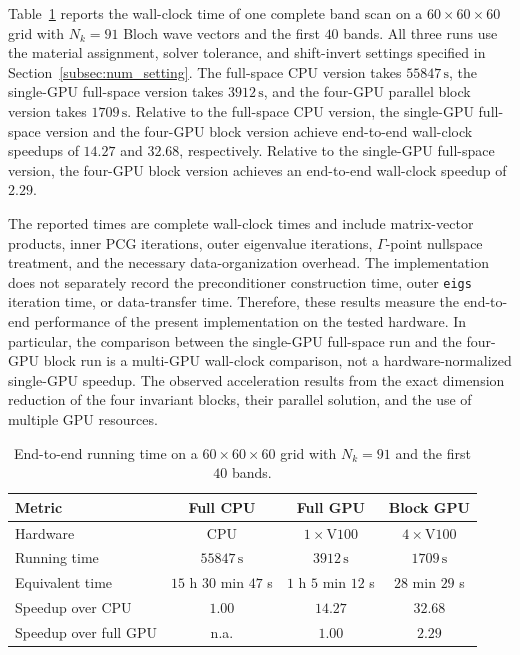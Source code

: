\documentclass[11pt,oneside]{article}
\numberwithin{equation}{section}
\theoremstyle{plain}
\theoremstyle{remark}
\begin{document}
Table~\ref{tab:num_timing_revised} reports the wall-clock time of one complete band scan on a \(60\times60\times60\) grid with \(N_k=91\) Bloch wave vectors and the first \(40\) bands. All three runs use the material assignment, solver tolerance, and shift-invert settings specified in Section~\ref{subsec:num_setting}. The full-space CPU version takes \(55847\,\mathrm{s}\), the single-GPU full-space version takes \(3912\,\mathrm{s}\), and the four-GPU parallel block version takes \(1709\,\mathrm{s}\). Relative to the full-space CPU version, the single-GPU full-space version and the four-GPU block version achieve end-to-end wall-clock speedups of \(14.27\) and \(32.68\), respectively. Relative to the single-GPU full-space version, the four-GPU block version achieves an end-to-end wall-clock speedup of \(2.29\).

The reported times are complete wall-clock times and include matrix-vector products, inner PCG iterations, outer eigenvalue iterations, \(\Gamma\)-point nullspace treatment, and the necessary data-organization overhead. The implementation does not separately record the preconditioner construction time, outer \texttt{eigs} iteration time, or data-transfer time. Therefore, these results measure the end-to-end performance of the present implementation on the tested hardware. In particular, the comparison between the single-GPU full-space run and the four-GPU block run is a multi-GPU wall-clock comparison, not a hardware-normalized single-GPU speedup. The observed acceleration results from the exact dimension reduction of the four invariant blocks, their parallel solution, and the use of multiple GPU resources.

\begin{table}[htbp]
\centering
\caption{End-to-end running time on a \(60\times60\times60\) grid with \(N_k=91\) and the first \(40\) bands.}
\label{tab:num_timing_revised}
\small
\renewcommand{\arraystretch}{1.12}
\begin{tabular}{lccc}
\toprule
Metric & Full CPU & Full GPU & Block GPU \\
\midrule
Hardware
& CPU
& \(1\times\mathrm{V100}\)
& \(4\times\mathrm{V100}\) \\
Running time
& \(55847\,\mathrm{s}\)
& \(3912\,\mathrm{s}\)
& \(1709\,\mathrm{s}\) \\
Equivalent time
& \(15\) h \(30\) min \(47\) s
& \(1\) h \(5\) min \(12\) s
& \(28\) min \(29\) s \\
Speedup over CPU
& \(1.00\)
& \(14.27\)
& \(32.68\) \\
Speedup over full GPU
& n.a.
& \(1.00\)
& \(2.29\) \\
\bottomrule
\end{tabular}
\end{table}
\end{document}
